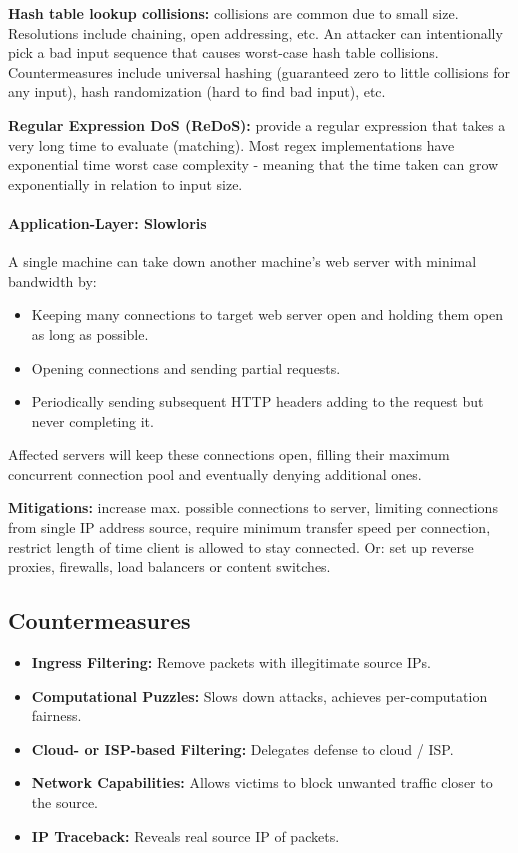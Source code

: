 \textbf{Hash table lookup collisions:} collisions are common due to small size. Resolutions include chaining, open addressing, etc. An attacker can intentionally pick a bad input sequence that causes worst-case hash table collisions. Countermeasures include universal hashing (guaranteed zero to little collisions for any input), hash randomization (hard to find bad input), etc. %

\textbf{Regular Expression DoS (ReDoS):} provide a regular expression that takes a very long time to evaluate (matching). Most regex implementations have exponential time worst case complexity - meaning that the time taken can grow exponentially in relation to input size.

\paragraph{Application-Layer: Slowloris}
A single machine can take down another machine's web server with minimal bandwidth by:
\begin{itemize}
    \item Keeping many connections to target web server open and holding them open as long as possible.
    \item Opening connections and sending partial requests.
    \item Periodically sending subsequent HTTP headers adding to the request but never completing it.
\end{itemize}
Affected servers will keep these connections open, filling their maximum concurrent connection pool and eventually denying additional ones. 

\textbf{Mitigations:} increase max. possible connections to server, limiting connections from single IP address source, require minimum transfer speed per connection, restrict length of time client is allowed to stay connected. Or: set up reverse proxies, firewalls, load balancers or content switches.

\subsection{Countermeasures}

\begin{itemize}
    \item \textbf{Ingress Filtering:} Remove packets with illegitimate source IPs.
    \item \textbf{Computational Puzzles:} Slows down attacks, achieves per-computation fairness.
    \item \textbf{Cloud- or ISP-based Filtering:} Delegates defense to cloud / ISP.
    \item \textbf{Network Capabilities:} Allows victims to block unwanted traffic closer to the source.
    \item \textbf{IP Traceback:} Reveals real source IP of packets.
\end{itemize}

